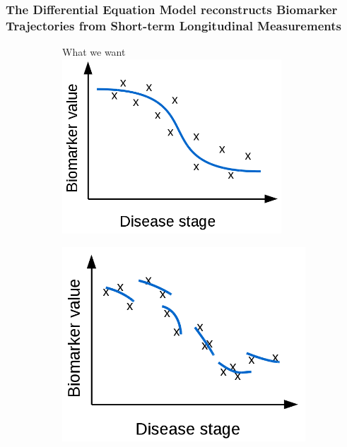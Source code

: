 \documentclass[8pt,xcolor=table]{beamer}
\begin{document}
\begin{frame}
\frametitle{The Differential Equation Model reconstructs Biomarker Trajectories from Short-term Longitudinal Measurements}

\begin{figure}[H]
 \centering
 \begin{subfigure}{0.3\textwidth}
    \centering
    What we want\\
    \vspace{1em}
    \includegraphics[width=0.90\textwidth]{demNewFigs/fig1.png}
    \vspace{1em}
 \end{subfigure}
 \begin{subfigure}{0.3\textwidth}
     \centering
     \vspace{1em}
     \includegraphics[width=\textwidth]{demNewFigs/fig2.png}

\end{subfigure}
\end{figure}
\end{frame}
\end{document}
